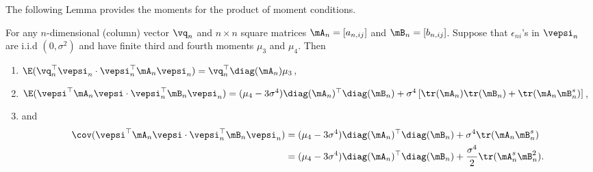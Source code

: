 \documentclass[english,12pt]{book}\usepackage[]{graphicx}\usepackage[]{xcolor}
\begin{document}
The following Lemma provides the moments for the product of moment conditions.

\begin{lemma}\label{lemma:O-lemma-lee-quadratic}
For any $n$-dimensional (column) vector $\vq_n$ and $n\times n$ square matrices $\mA_n = [a_{n, ij}]$ and $\mB_n = [b_{n, ij}]$. Suppose that $\epsilon_{ni}$'s in $\vepsi_n$ are i.i.d $(0, \sigma^2)$ and have finite third and fourth moments $\mu_3$ and $\mu_4$. Then
\begin{enumerate}
\item $\E(\vq_n^\top\vepsi_n \cdot \vepsi_n^\top\mA_n\vepsi_n) = \vq_n^\top\diag(\mA_n)\mu_3$, 
\item $\E(\vepsi^\top\mA_n\vepsi \cdot \vepsi_n^\top\mB_n\vepsi_n) = (\mu_4 - 3\sigma^4)\diag(\mA_n)^\top\diag(\mB_n) + \sigma^4\left[\tr(\mA_n)\tr(\mB_n) + \tr(\mA_n\mB_n^s)\right]$, 
\item and 
\begin{equation*}
\begin{aligned}
\cov(\vepsi^\top\mA_n\vepsi \cdot \vepsi_n^\top\mB_n\vepsi_n) & = (\mu_4 - 3\sigma^4)\diag(\mA_n)^\top\diag(\mB_n) + \sigma^4\tr(\mA_n\mB^s_n) \\
&= (\mu_4 - 3\sigma^4)\diag(\mA_n)^\top\diag(\mB_n) + \frac{\sigma^4}{2}\tr(\mA_n^s\mB_n^2).
\end{aligned}
\end{equation*}
\end{enumerate}
\end{lemma}
\end{document}
